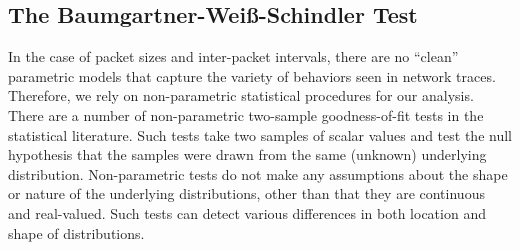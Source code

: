 \documentclass[conference]{IEEEtran}
\newcommand{\caps}[1]{{\small{#1}}}
\begin{document}
\subsection{The Baumgartner-Wei\ss-Schindler Test}



In the case of packet sizes and inter-packet intervals, there are no ``clean'' parametric models that capture the variety of behaviors seen in network traces. Therefore, we rely on non-parametric statistical procedures for our analysis. There are a number of non-parametric two-sample goodness-of-fit tests in the statistical literature. %
Such tests take two samples of scalar values and test the null hypothesis that the samples were drawn from the same (unknown) underlying distribution. Non-parametric tests do not make any assumptions about the shape or nature of the underlying distributions, other than that they are continuous and real-valued. Such tests can detect various differences in both location and shape of distributions.
\end{document}
